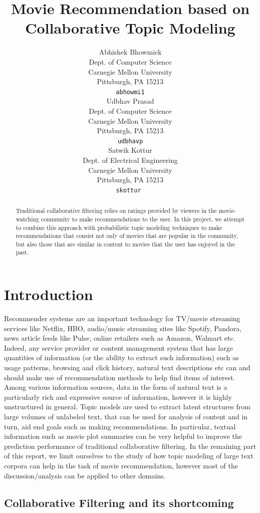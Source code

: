 \documentclass{article} %
\title{Movie Recommendation based on Collaborative Topic Modeling}
\author{
Abhishek Bhowmick \\
Dept. of Computer Science\\
Carnegie Mellon University\\
Pittsburgh, PA 15213 \\
\texttt{abhowmi1} \\
\And
Udbhav Prasad \\
Dept. of Computer Science\\
Carnegie Mellon University\\
Pittsburgh, PA 15213 \\
\texttt{udbhavp} \\
\And
Satwik Kottur \\
Dept. of Electrical Engineering\\
Carnegie Mellon University\\
Pittsburgh, PA 15213 \\
\texttt{skottur}\ \\
}
\begin{document}
\maketitle

\begin{abstract}
Traditional collaborative filtering relies on ratings provided by viewers
in the movie-watching community to make recommendations to the user. In this
project, we attempt to combine this approach with probabilistic topic modeling
techniques to make recommendations that consist not only of movies that are
popular in the community, but also those that are similar in content to movies
that the user has enjoyed in the past.  
\end{abstract}

\section{Introduction}

Recommender systems are an important technology for TV/movie streaming
services like Netflix, HBO, audio/music streaming sites like Spotify, 
Pandora, news article feeds like Pulse, online retailers such as Amazon, Walmart
etc. Indeed, any service provider or content management system that has large
quantities of information (or the ability to extract such information) such as 
usage patterns, browsing and click history, natural text descriptions etc can
and should make use of recommendation methods to help find items of interest. 
Among various information sources, data in the form of natural text is a 
particularly rich and expressive source of information, however it is highly 
unstructured in general. Topic models are used to extract latent structures
from large volumes of unlabeled text, that can be used for analysis of 
content and in turn, aid end goals such as making recommendations. In
particular, textual information such as movie plot summaries can be very
helpful to improve the prediction performance of traditional
collaborative filtering. In the remaining 
part of this report, we limit ourselves to the study of how topic modeling of 
large text corpora can help in the task of movie recommendation, however most 
of the discussion/analysis can be applied to other domains.  

\subsection{Collaborative Filtering and its shortcoming}
\end{document}
